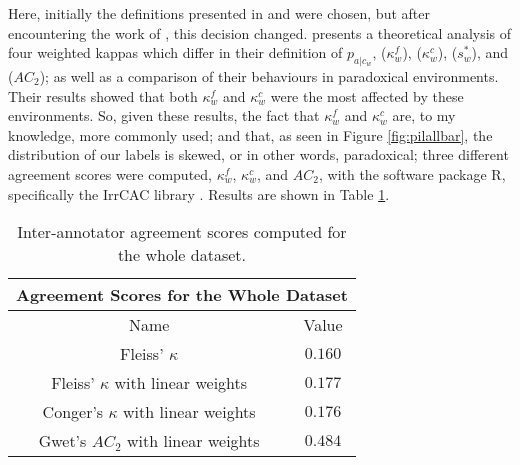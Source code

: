 Here, initially the definitions presented in \citet{warrens2012equivalences} and \citet{warrens2014corrected} were chosen, but after encountering the work of \citet{vanacore2022robustness}, this decision changed. \citet{vanacore2022robustness} presents a theoretical analysis of four weighted kappas which differ in their definition of $p_{a|c_w}$, \citet{fleiss1971measuring} ($\kappa^{f}_{w}$), \citet{conger1980integration} ($\kappa^{c}_{w}$), \citet{brennan1981coefficient} ($s^{*}_{w}$), and \citet{gwet2008computing} ($AC_2$); as well as a comparison of their behaviours in paradoxical environments. Their results showed that both $\kappa^{f}_{w}$ and $\kappa^{c}_{w}$ were the most affected by these environments. So, given these results, the fact that $\kappa^{f}_{w}$ and $\kappa^{c}_{w}$ are, to my knowledge, more commonly used; and that, as seen in Figure \ref{fig:pilallbar}, the distribution of our labels is skewed, or in other words, paradoxical; three different agreement scores were computed, $\kappa^{f}_{w}$, $\kappa^{c}_{w}$, and $AC_2$, with the software package R, specifically the IrrCAC library \citep{gwet2019irrcac}. Results are shown in Table \ref{tab:iaa}.\\

\begin{table}
\centering
\begin{tabular}{|c|c|}
\hline
\multicolumn{2}{|c|}{Agreement Scores for the Whole Dataset}\\\hline
Name & Value \\\hline
Fleiss' $\kappa$ & $0.160$\\\hline
Fleiss' $\kappa$ with linear weights & $0.177$\\\hline
Conger's $\kappa$ with linear weights & $0.176$\\\hline
Gwet's $AC_2$ with linear weights & $0.484$\\\hline
\end{tabular}
\caption{Inter-annotator agreement scores computed for the whole dataset.}
\label{tab:iaa}
\end{table}

